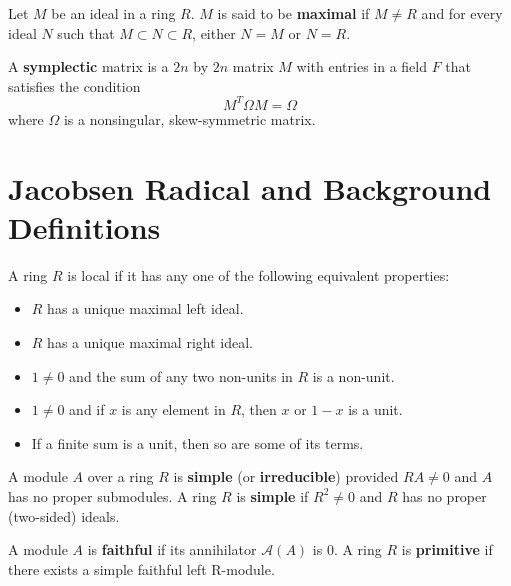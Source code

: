 \documentclass[11pt]{article}
\newenvironment{definition}[1][Definition]{\begin{trivlist}
\item[\hskip \labelsep {\bfseries #1}]}{\end{trivlist}}
\begin{document}
\begin{definition}
Let $M$ be an ideal in a ring $R$. $M$ is said to be \textbf{maximal} if $M \ne R$ and for every ideal $N$ such that $M \subset N \subset R$,
either $N = M$ or $N = R$.
\end{definition}

\begin{definition}
A \textbf{symplectic} matrix is a $2n$ by $2n$ matrix $M$ with entries in a field $F$ that satisfies the condition
\[
M^{T} \Omega M = \Omega
\]
where $\Omega$ is a nonsingular, skew-symmetric matrix.
\end{definition}


\section*{Jacobsen Radical and Background Definitions}

\begin{definition}
A ring $R$ is local if it has any one of the following equivalent properties:
\begin{itemize}
\item $R$ has a unique maximal left ideal.
\item $R$ has a unique maximal right ideal.
\item $1 \ne 0$ and the sum of any two non-units in $R$ is a non-unit.
\item $1 \ne 0$ and if $x$ is any element in $R$, then $x$ or $1 - x$ is a unit.
\item If a finite sum is a unit, then so are some of its terms.
\end{itemize}
\end{definition}

\begin{definition}
A module $A$ over a ring $R$ is \textbf{simple} (or \textbf{irreducible}) provided $RA \ne 0$ and $A$ has no proper submodules.
A ring $R$ is \textbf{simple} if $R^2 \ne 0$ and $R$ has no proper (two-sided) ideals.
\end{definition}

\begin{definition}
A module $A$ is \textbf{faithful} if its annihilator $\mathcal{A}(A)$ is 0.
A ring $R$ is \textbf{primitive} if there exists a simple faithful left R-module.
\end{definition}
\end{document}
